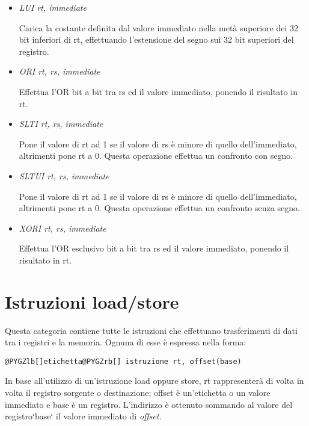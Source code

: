 \documentclass[letterpaper,10pt,english]{sphinxmanual}
\begin{document}
\begin{itemize}
\item {} 
\emph{LUI rt, immediate}

Carica la costante definita dal valore immediato nella metà superiore dei 32
bit inferiori di rt, effettuando l'estensione del segno sui 32 bit superiori
del registro.

\item {} 
\emph{ORI rt, rs, immediate}

Effettua l'OR bit a bit tra rs ed il valore immediato, ponendo il risultato
in rt.

\item {} 
\emph{SLTI rt, rs, immediate}

Pone il valore di rt ad 1 se il valore di rs è minore di quello
dell'immediato, altrimenti pone rt a 0. Questa operazione effettua un
confronto con segno.

\item {} 
\emph{SLTUI rt, rs, immediate}

Pone il valore di rt ad 1 se il valore di rs è minore di quello
dell'immediato, altrimenti pone rt a 0. Questa operazione effettua un
confronto senza segno.

\item {} 
\emph{XORI rt, rs, immediate}

Effettua l'OR esclusivo bit a bit tra rs ed il valore immediato, ponendo il
risultato in rt.

\end{itemize}


\section{Istruzioni load/store}
\label{instructions:istruzioni-load-store}
Questa categoria contiene tutte le istruzioni che effettuano trasferimenti di
dati tra i registri e la memoria. Ognuna di esse è espressa nella forma:

\begin{Verbatim}[commandchars=@\[\]]
@PYGZlb[]etichetta@PYGZrb[] istruzione rt, offset(base)
\end{Verbatim}

In base all'utilizzo di un'istruzione load oppure store, rt rappresenterà di
volta in volta il registro sorgente o destinazione; offset è un'etichetta o un
valore immediato e base è un registro.  L'indirizzo è ottenuto sommando al
valore del registro{}`base{}` il valore immediato di \emph{offset}.
\end{document}
